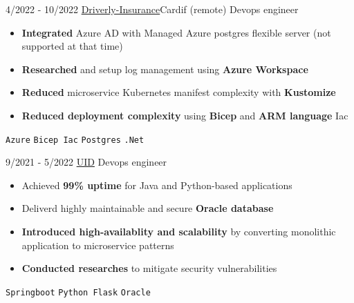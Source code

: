 \documentclass[9pt]{developercv} %
\begin{document}
\begin{entrylist}
    \entry
    {4/2022 - 10/2022}
    {\href{https://driverly.co.uk}{Driverly-Insurance}\newline\small\textnormal{Cardif (remote)}}
    {Devops engineer}
    {\vspace{-6pt}
    \begin{itemize}[itemsep=2pt,topsep=0pt,parsep=0pt,partopsep=0pt, leftmargin=-1pt]
        \item{\textbf{Integrated} Azure AD with Managed Azure postgres flexible server (not supported at that time)}
        \item{\textbf{Researched} and setup log management using \textbf{Azure Workspace}}
        \item{\textbf{Reduced} microservice Kubernetes manifest complexity with \textbf{Kustomize}}
        \item{\textbf{Reduced deployment complexity} using \textbf{Bicep} and \textbf{ARM language} Iac}
    \end{itemize}
    {\vspace{2pt}}
    \texttt{Azure} \slashsep \texttt{Bicep Iac} \slashsep \texttt{Postgres} \slashsep \texttt{.Net}}
\end{entrylist}
\begin{center}
    \hdashrule[0.2ex]{\linewidth}{0.5pt}{.8mm}
\end{center}
\vspace{5pt}
\begin{entrylist}
    \entry
    {9/2021 - 5/2022}
    {\href{https://u-id.net}{UID}}
    {Devops engineer}
    {\vspace{-6pt}
    \begin{itemize}[itemsep=2pt,topsep=0pt,parsep=0pt,partopsep=0pt, leftmargin=-1pt]
        \item{Achieved \textbf{99\% uptime} for Java and Python-based applications}
        \item{Deliverd highly maintainable and secure \textbf{Oracle database}}
        \item{\textbf{Introduced high-availablity and scalability} by converting monolithic application to microservice patterns}
        \item{\textbf{Conducted researches} to mitigate security vulnerabilities}
    \end{itemize}
    {\vspace{2pt}}
    \texttt{Springboot} \slashsep \texttt{Python Flask} \slashsep \texttt{Oracle}}
\end{entrylist}
\end{document}
